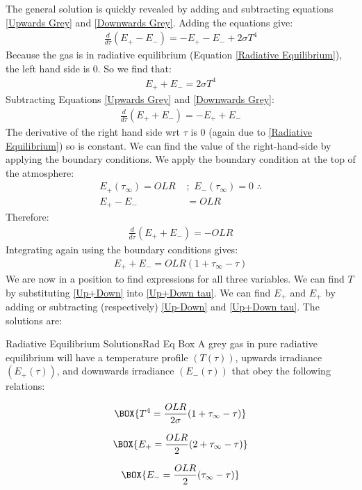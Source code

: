 The general solution is quickly revealed by adding and subtracting equations \ref{Upwards Grey} and \ref{Downwards Grey}. Adding the equations give:
\begin{align*}
    \frac{d}{d\tau}(E_+-E_-)=-E_+-E_-+2\sigma T^4
\end{align*}
Because the gas is in radiative equilibrium (Equation \ref{Radiative Equilibrium}), the left hand side is $0$. So we find that:
\begin{align}\label{Up+Down}
    E_++E_-=2\sigma T^4
\end{align}
Subtracting Equations \ref{Upwards Grey} and \ref{Downwards Grey}:
\begin{align*}
    \frac{d}{d\tau}(E_++E_-)=-E_++E_-
\end{align*}
The derivative of the right hand side wrt $\tau$ is $0$ (again due to \ref{Radiative Equilibrium}) so is constant. We can find the value of the right-hand-side by applying the boundary conditions. We apply the boundary condition at the top of the atmosphere:
\begin{align}
    E_+(\tau_\infty)=OLR \,\, &;\,\,  
    E_-(\tau_\infty)=0\,\, \therefore\nonumber\\
    E_+-E_-&=OLR\label{Up-Down}
\end{align}
Therefore:
\begin{align*}
    \frac{d}{d\tau}(E_++E_-)=-OLR
\end{align*}
Integrating again using the boundary conditions gives:
\begin{align}
    E_++E_-=OLR(1+\tau_\infty-\tau)\label{Up+Down tau}
\end{align}
We are now in a position to find expressions for all three variables. We can find $T$ by substituting \ref{Up+Down} into \ref{Up+Down tau}. We can find $E_+$ and $E_+$ by adding or subtracting (respectively) \ref{Up-Down} and \ref{Up+Down tau}. The solutions are:
\begin{fact}{Radiative Equilibrium Solutions}{Rad Eq Box}\label{Rad Eq Box}
    A grey gas in pure radiative equilibrium will have a temperature profile $(T(\tau))$, upwards irradiance $(E_+(\tau))$, and downwards irradiance $(E_-(\tau))$ that obey the following relations:

    \begin{gather}
        \label{Radiative Eq Temperature}
        \BOX{T^4=\frac{OLR}{2\sigma}(1+\tau_\infty-\tau)}
    \end{gather}

    \begin{minipage}{.48\linewidth}
        \begin{gather}
            \BOX{E_+=\frac{OLR}{2}(2+\tau_\infty-\tau)}
        \end{gather}
    \end{minipage}
    \hfill
    \begin{minipage}{.48\linewidth}
        \begin{gather}
            \BOX{E_-=\frac{OLR}{2}(\tau_\infty-\tau)}
        \end{gather}
    \end{minipage}
\end{fact}

